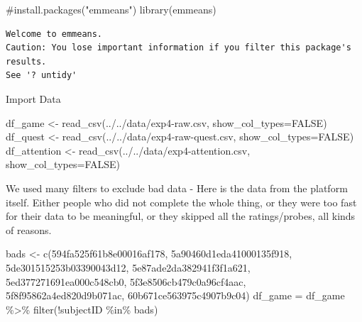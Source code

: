 \documentclass[
  letterpaper,
  DIV=11,
  numbers=noendperiod]{scrartcl}
\newenvironment{Shaded}{\begin{snugshade}}{\end{snugshade}}
\newcommand{\AttributeTok}[1]{\textcolor[rgb]{0.40,0.45,0.13}{#1}}
\newcommand{\CommentTok}[1]{\textcolor[rgb]{0.37,0.37,0.37}{#1}}
\newcommand{\ConstantTok}[1]{\textcolor[rgb]{0.56,0.35,0.01}{#1}}
\newcommand{\FunctionTok}[1]{\textcolor[rgb]{0.28,0.35,0.67}{#1}}
\newcommand{\NormalTok}[1]{\textcolor[rgb]{0.00,0.23,0.31}{#1}}
\newcommand{\OtherTok}[1]{\textcolor[rgb]{0.00,0.23,0.31}{#1}}
\newcommand{\SpecialCharTok}[1]{\textcolor[rgb]{0.37,0.37,0.37}{#1}}
\newcommand{\StringTok}[1]{\textcolor[rgb]{0.13,0.47,0.30}{#1}}
\begin{document}
\begin{Shaded}
\begin{Highlighting}[]
\CommentTok{\#install.packages("emmeans")}
\FunctionTok{library}\NormalTok{(emmeans)}
\end{Highlighting}
\end{Shaded}

\begin{verbatim}
Welcome to emmeans.
Caution: You lose important information if you filter this package's results.
See '? untidy'
\end{verbatim}

Import Data

\begin{Shaded}
\begin{Highlighting}[]
\NormalTok{df\_game }\OtherTok{\textless{}{-}} \FunctionTok{read\_csv}\NormalTok{(}\StringTok{\textquotesingle{}../../data/exp4{-}raw.csv\textquotesingle{}}\NormalTok{, }\AttributeTok{show\_col\_types=}\ConstantTok{FALSE}\NormalTok{)}
\NormalTok{df\_quest }\OtherTok{\textless{}{-}} \FunctionTok{read\_csv}\NormalTok{(}\StringTok{\textquotesingle{}../../data/exp4{-}raw{-}quest.csv\textquotesingle{}}\NormalTok{, }\AttributeTok{show\_col\_types=}\ConstantTok{FALSE}\NormalTok{)}
\NormalTok{df\_attention }\OtherTok{\textless{}{-}} \FunctionTok{read\_csv}\NormalTok{(}\StringTok{\textquotesingle{}../../data/exp4{-}attention.csv\textquotesingle{}}\NormalTok{, }\AttributeTok{show\_col\_types=}\ConstantTok{FALSE}\NormalTok{)}
\end{Highlighting}
\end{Shaded}

We used many filters to exclude bad data - Here is the data from the
platform itself. Either people who did not complete the whole thing, or
they were too fast for their data to be meaningful, or they skipped all
the ratings/probes, all kinds of reasons.

\begin{Shaded}
\begin{Highlighting}[]
\NormalTok{bads }\OtherTok{\textless{}{-}} \FunctionTok{c}\NormalTok{(}\StringTok{\textquotesingle{}594fa525f61b8e00016af178\textquotesingle{}}\NormalTok{, }\StringTok{\textquotesingle{}5a90460d1eda41000135f918\textquotesingle{}}\NormalTok{,}
       \StringTok{\textquotesingle{}5de301515253b03390043d12\textquotesingle{}}\NormalTok{, }\StringTok{\textquotesingle{}5e87ade2da382941f3f1a621\textquotesingle{}}\NormalTok{,}
       \StringTok{\textquotesingle{}5ed377271691ea000c548cb0\textquotesingle{}}\NormalTok{, }\StringTok{\textquotesingle{}5f3e8506cb479c0a96cf4aac\textquotesingle{}}\NormalTok{,}
       \StringTok{\textquotesingle{}5f8f95862a4ed820d9b071ac\textquotesingle{}}\NormalTok{, }\StringTok{\textquotesingle{}60b671ce563975c4907b9c04\textquotesingle{}}\NormalTok{)}
\NormalTok{df\_game }\OtherTok{=}\NormalTok{ df\_game }\SpecialCharTok{\%\textgreater{}\%} \FunctionTok{filter}\NormalTok{(}\SpecialCharTok{!}\NormalTok{subjectID }\SpecialCharTok{\%in\%}\NormalTok{ bads)}
\end{Highlighting}
\end{Shaded}
\end{document}
